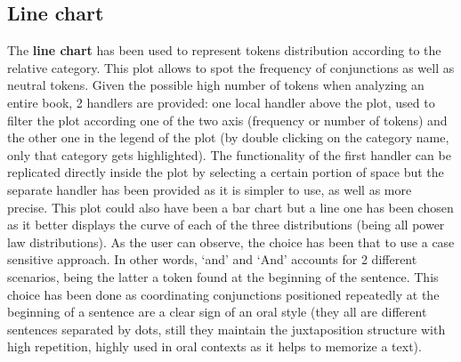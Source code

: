 \documentclass[sigchi]{article}
\begin{document}
\subsection{Line chart}
The \textbf{line chart} \cite{linechart} has been used to represent tokens distribution according to the relative category. This plot allows to spot the frequency of conjunctions as well as neutral tokens. Given the possible high number of tokens when analyzing an entire book, 2 handlers are provided: one local handler above the plot, used to filter the plot according one of the two axis (frequency or number of tokens) and the other one in the legend of the plot (by double clicking on the category name, only that category gets highlighted). The functionality of the first handler can be replicated directly inside the plot by selecting a certain portion of space but the separate handler has been provided as it is simpler to use, as well as more precise. This plot could also have been a bar chart but a line one has been chosen as it better displays the curve of each of the three distributions (being all power law distributions). As the user can observe, the choice has  been that to use a case sensitive approach. In other words, ‘and’ and ‘And’ accounts for 2 different scenarios, being the latter a token found at the beginning of the sentence. This choice has been done as coordinating conjunctions positioned repeatedly at the beginning of a sentence are a clear sign of an oral style (they all are different sentences separated by dots, still they maintain the juxtaposition structure with high repetition, highly used in oral contexts as it helps to memorize a text).
\end{document}
